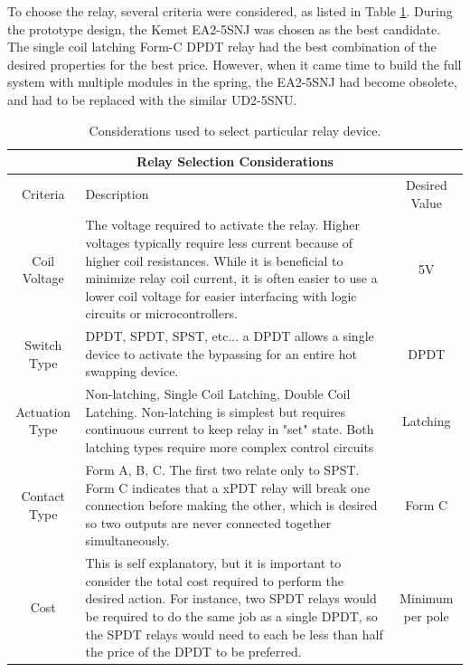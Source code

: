 		To choose the relay, several criteria were considered, as listed in Table \ref{tab:relay_criteria}.  During the prototype design, the Kemet EA2-5SNJ was chosen as the best candidate.  The single coil latching Form-C DPDT relay had the best combination of the desired properties for the best price.  However, when it came time to build the full system with multiple modules in the spring, the EA2-5SNJ had become obsolete, and had to be replaced with the similar UD2-5SNU.

		\begin{table}
		\begin{center}
		\begin{tabular}{ |c p{3in} c| }
		\hline
		\multicolumn{3}{|c|}{\large Relay Selection Considerations \normalsize} \\
		\hline
		Criteria & Description & Desired Value\\ 
		 \hline
		Coil Voltage 	& The voltage required to activate the relay.  Higher voltages typically require less current because of higher coil resistances.  While it is beneficial to minimize relay coil current, it is often easier to use a lower coil voltage for easier interfacing with logic circuits or microcontrollers.  & 5V \\
		Switch Type 	& DPDT, SPDT, SPST, etc... a DPDT allows a single device to activate the bypassing for an entire hot swapping device.  & DPDT \\
		Actuation Type 	& Non-latching, Single Coil Latching, Double Coil Latching.  Non-latching is simplest but requires continuous current to keep relay in "set" state.  Both latching types require more complex control circuits & Latching \\
		Contact Type 	& Form A, B, C.  The first two relate only to SPST.  Form C indicates that a xPDT relay will break one connection before making the other, which is desired so two outputs are never connected together simultaneously. & Form C  \\
		Cost 			& This is self explanatory, but it is important to consider the total cost required to perform the desired action.  For instance, two SPDT relays would be required to do the same job as a single DPDT, so the SPDT relays would need to each be less than half the price of the DPDT to be preferred. & Minimum per pole \\
	   	\hline
		\end{tabular}
		\caption{Considerations used to select particular relay device.}
		\label{tab:relay_criteria}
		\end{center}
		\end{table}

